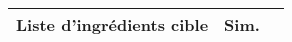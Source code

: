 \begin{longtable}{p{9cm}p{9cm}c}
                                                                                                                                                                                                                                                                                                                                                                                                                                                                                                                                                                                                                                                                                                                                                                                                                                                                                                                                                                                                                                                                                                                                                     Liste d'ingrédients cible &     Sim. \\ \hline
\midrule
\endfirsthead
\toprule

\end{longtable}
